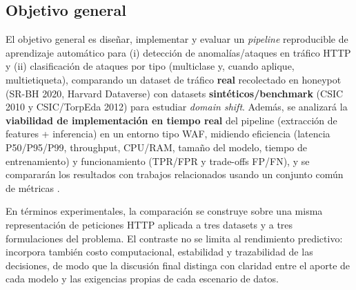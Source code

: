 \documentclass[12pt,oneside]{report}
\begin{document}
\subsection{Objetivo general}

El objetivo general es diseñar, implementar y evaluar un \textit{pipeline} reproducible de aprendizaje automático para
(i) detección de anomalías/ataques en tráfico HTTP y (ii) clasificación de ataques por tipo (multiclase y, cuando aplique, multietiqueta),
comparando un dataset de tráfico \textbf{real} recolectado en honeypot (SR-BH 2020, Harvard Dataverse) con datasets \textbf{sintéticos/benchmark}
(CSIC 2010 y CSIC/TorpEda 2012) para estudiar \textit{domain shift}.
Además, se analizará la \textbf{viabilidad de implementación en tiempo real} del pipeline (extracción de features + inferencia) en un entorno tipo WAF,
midiendo eficiencia (latencia P50/P95/P99, throughput, CPU/RAM, tamaño del modelo, tiempo de entrenamiento) y funcionamiento (TPR/FPR y trade-offs FP/FN),
y se compararán los resultados con trabajos relacionados usando un conjunto común de métricas \cite{srbh_paper,ocswaf_zenodo,riverol_2024,fang_2024,zhou_2024,saito_pr_auc,chicco_mcc}.

En términos experimentales, la comparación se construye sobre una misma representación de peticiones HTTP aplicada a tres datasets y a tres formulaciones del problema. El contraste no se limita al rendimiento predictivo: incorpora también costo computacional, estabilidad y trazabilidad de las decisiones, de modo que la discusión final distinga con claridad entre el aporte de cada modelo y las exigencias propias de cada escenario de datos.
\end{document}

